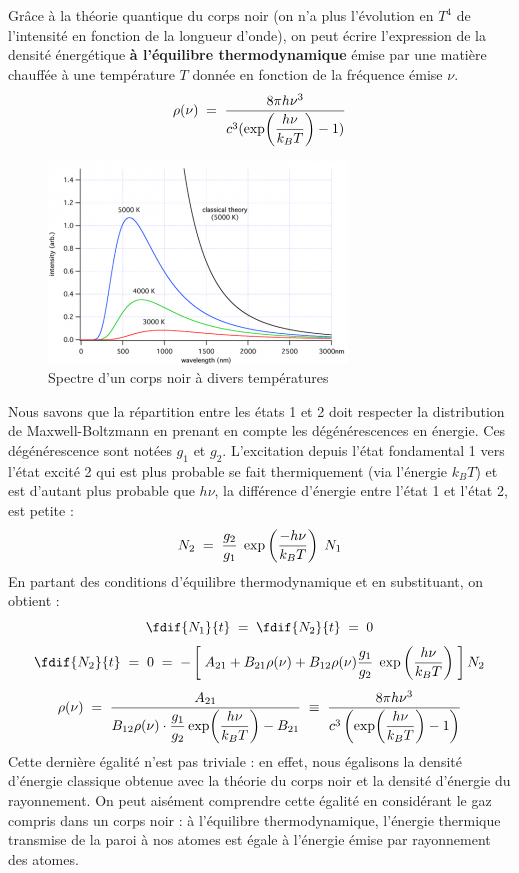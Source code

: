 Grâce à la théorie quantique du corps noir (on n'a plus l'évolution en $T^4$ de l'intensité en fonction de la longueur d'onde), on peut écrire l'expression de la densité énergétique \textbf{à l'équilibre thermodynamique} émise par une matière chauffée à une température $T$ donnée en fonction de la fréquence émise $\nu$.
\begin{equation}
    \rho(\nu) \; = \; \dfrac{8\pi h \nu^3}{c^3(\exp(\dfrac{h\nu}{k_BT})-1)}
\end{equation}
\begin{figure}[htp]
    \centering
    \includegraphics[scale=1.1]{Images2/corps_noir.png}
    \caption{Spectre d'un corps noir à divers températures}
    \label{fig : Corps noir}
\end{figure}
Nous savons que la répartition entre les états 1 et 2 doit respecter la distribution de Maxwell-Boltzmann en prenant en compte les dégénérescences en énergie. Ces dégénérescence sont notées $g_1$ et $g_2$. L'excitation depuis l'état fondamental 1 vers l'état excité 2 qui est plus probable se fait thermiquement (via l'énergie $k_BT$) et est d'autant plus probable que $h\nu$, la différence d'énergie entre l'état 1 et l'état 2, est petite :
\[
    N_2 \; = \; \dfrac{g_2}{g_1} \; \exp\left(\dfrac{-h\nu}{k_BT}\right) \;N_1
\]
En partant des conditions d'équilibre thermodynamique et en substituant, on obtient :
\[
    \fdif{N_1}{t} \eq \fdif{N_2}{t} \eq 0
\]
\[
    \fdif{N_2}{t}
    \eq 0
    \eq - \left[\;A_{21} + B_{21} \rho(\nu) + B_{12}\rho(\nu) \dfrac{g_1}{g_2} \; \exp\left(\dfrac{h\nu}{k_BT}\right) \;\right] N_2
\]
\[
    \rho(\nu)
    \; = \; \dfrac{A_{21}}{B_{12}\rho(\nu) \cdot \dfrac{g_1}{g_2} \exp(\dfrac{h\nu}{k_BT}) - B_{21}}
    \;\equiv\; \dfrac{8\pi h \nu^3}{c^3\left(\exp(\dfrac{h\nu}{k_BT})-1\right)}
\]
Cette dernière égalité n'est pas triviale : en effet, nous égalisons la densité d'énergie classique obtenue avec la théorie du corps noir et la densité d'énergie du rayonnement. On peut aisément comprendre cette égalité en considérant le gaz compris dans un corps noir : à l'équilibre thermodynamique, l'énergie thermique transmise de la paroi à nos atomes est égale à l'énergie émise par rayonnement des atomes.\\
